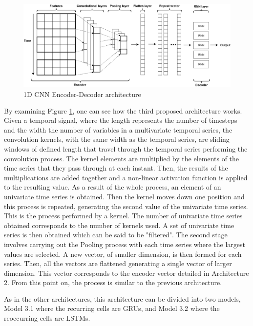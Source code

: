 \begin{figure}[h!]
    \centering
    \begin{center}
    \includegraphics[width=1\textwidth]{Images/ED.png}
    \caption{1D CNN Encoder-Decoder architecture}
    \label{arc3}
    \end{center}
\end{figure}

By examining Figure \ref{arc3}, one can see how the third proposed architecture works. Given a temporal signal, where the length represents the number of timesteps and the width the number of variables in a multivariate temporal series, the convolution kernels, with the same width as the temporal series, are sliding windows of defined length that travel through the temporal series performing the convolution process. The kernel elements are multiplied by the elements of the time series that they pass through at each instant. Then, the results of the multiplications are added together and a non-linear activation function is applied to the resulting value. As a result of the whole process, an element of an univariate time series is obtained. Then the kernel moves down one position and this process is repeated, generating the second value of the univariate time series. This is the process performed by a kernel. The number of univariate time series obtained corresponds to the number of kernels used. A set of univariate time series is then obtained which can be said to be "filtered". The second stage involves carrying out the Pooling process with each time series where the largest values are selected. A new vector, of smaller dimension, is then formed for each series. Then, all the vectors are flattened generating a single vector of larger dimension. This vector corresponds to the encoder vector detailed in Architecture 2. From this point on, the process is similar to the previous architecture. 

As in the other architectures, this architecture can be divided into two models, Model 3.1 where the recurring cells are \ac{GRU}s, and Model 3.2 where the reoccurring cells are \ac{LSTM}s. 



